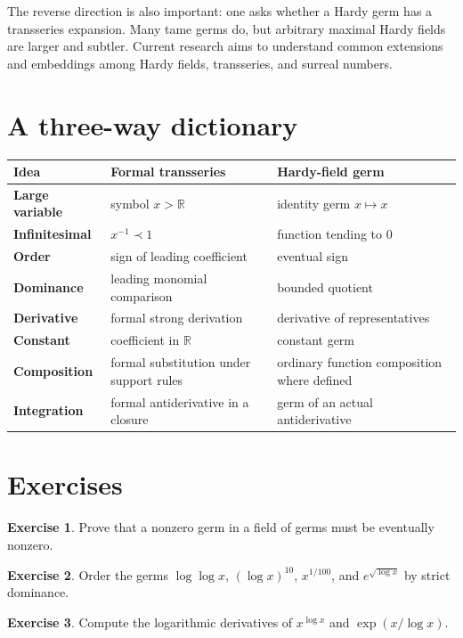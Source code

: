 \documentclass[11pt,openany]{book}
\theoremstyle{definition}
\newtheorem{exercise}{Exercise}[chapter]
\theoremstyle{plain}
\theoremstyle{remark}
\newcommand{\R}{\mathbb{R}}
\newcommand{\precdom}{\prec}
\begin{document}
The reverse direction is also important: one asks whether a Hardy germ has a transseries expansion. Many tame germs do, but arbitrary maximal Hardy fields are larger and subtler. Current research aims to understand common extensions and embeddings among Hardy fields, transseries, and surreal numbers.

\section{A three-way dictionary}

\begin{center}
\begin{tabularx}{\textwidth}{>{\bfseries}p{}XX}
\toprule
Idea & Formal transseries & Hardy-field germ\\
\midrule
Large variable & symbol $x>\R$ & identity germ $x\mapsto x$\\
Infinitesimal & $x^{-1}\precdom1$ & function tending to $0$\\
Order & sign of leading coefficient & eventual sign\\
Dominance & leading monomial comparison & bounded quotient\\
Derivative & formal strong derivation & derivative of representatives\\
Constant & coefficient in $\R$ & constant germ\\
Composition & formal substitution under support rules & ordinary function composition where defined\\
Integration & formal antiderivative in a closure & germ of an actual antiderivative\\
\bottomrule
\end{tabularx}
\end{center}

\section{Exercises}

\begin{exercise}
Prove that a nonzero germ in a field of germs must be eventually nonzero.
\end{exercise}

\begin{exercise}
Order the germs $\log\log x$, $(\log x)^{10}$, $x^{1/100}$, and $e^{\sqrt{\log x}}$ by strict dominance.
\end{exercise}

\begin{exercise}
Compute the logarithmic derivatives of $x^{\log x}$ and $\exp(x/\log x)$.
\end{exercise}
\end{document}

